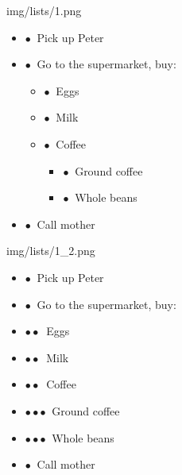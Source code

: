\documentclass[14pt]{article}
\begin{document}
\fontsize{14}{14}\selectfont
\noindent
img/lists/1.png
\begin{itemize}
\setlength{\itemsep}{0pt}
\setlength{\parskip}{0pt}
\setlength{\parsep}{0pt}
\item $\bullet\ $ Pick up Peter
\item $\bullet\ $ Go to the supermarket, buy:
\begin{itemize}
\setlength{\itemsep}{0pt}
\setlength{\parskip}{0pt}
\setlength{\parsep}{0pt}
\item $\bullet\ $ Eggs
\item $\bullet\ $ Milk
\item $\bullet\ $ Coffee
\begin{itemize}
\setlength{\itemsep}{0pt}
\setlength{\parskip}{0pt}
\setlength{\parsep}{0pt}
\item $\bullet\ $ Ground coffee
\item $\bullet\ $ Whole beans
\end{itemize}
\end{itemize}
\item $\bullet\ $ Call mother
\end{itemize}
\noindent
img/lists/1\_2.png
\begin{itemize}
\setlength{\itemsep}{1pt}
\setlength{\parskip}{0pt}
\setlength{\parsep}{0pt}
\item $\bullet\ $ Pick up Peter
\item $\bullet\ $ Go to the supermarket, buy:
\item $\bullet\bullet\ $ Eggs
\item $\bullet\bullet\ $ Milk
\item $\bullet\bullet\ $ Coffee
\item $\bullet\bullet$$\bullet\ $ Ground coffee
\item $\bullet\bullet$$\bullet\ $ Whole beans
\item $\bullet\ $ Call mother
\end{itemize}
\noindent
\end{document}
